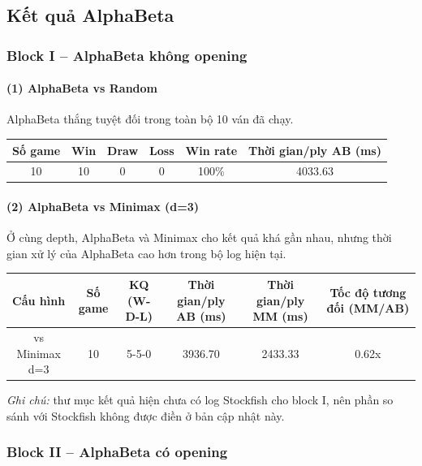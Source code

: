 \subsection{Kết quả AlphaBeta}

\subsubsection{Block I -- AlphaBeta không opening}

\paragraph*{(1) AlphaBeta vs Random}
AlphaBeta thắng tuyệt đối trong toàn bộ 10 ván đã chạy.

\begin{center}
\begin{tabular}{|c|c|c|c|c|c|}
\hline
\textbf{Số game} & \textbf{Win} & \textbf{Draw} & \textbf{Loss} & \textbf{Win rate} & \textbf{Thời gian/ply AB (ms)} \\
\hline
10 & 10 & 0 & 0 & 100\% & 4033.63 \\
\hline
\end{tabular}
\end{center}

\paragraph*{(2) AlphaBeta vs Minimax (d=3)}
Ở cùng depth, AlphaBeta và Minimax cho kết quả khá gần nhau, nhưng thời gian xử lý của AlphaBeta cao hơn trong bộ log hiện tại.

\begin{center}
\begin{tabular}{|c|c|c|c|c|c|}
\hline
\textbf{Cấu hình} & \textbf{Số game} & \textbf{KQ (W-D-L)} & \textbf{Thời gian/ply AB (ms)} & \textbf{Thời gian/ply MM (ms)} & \textbf{Tốc độ tương đối (MM/AB)} \\
\hline
vs Minimax d=3 & 10 & 5-5-0 & 3936.70 & 2433.33 & 0.62x \\
\hline
\end{tabular}
\end{center}

\noindent
\textit{Ghi chú:} thư mục kết quả hiện chưa có log Stockfish cho block I, nên phần so sánh với Stockfish không được điền ở bản cập nhật này.

\subsubsection{Block II -- AlphaBeta có opening}

